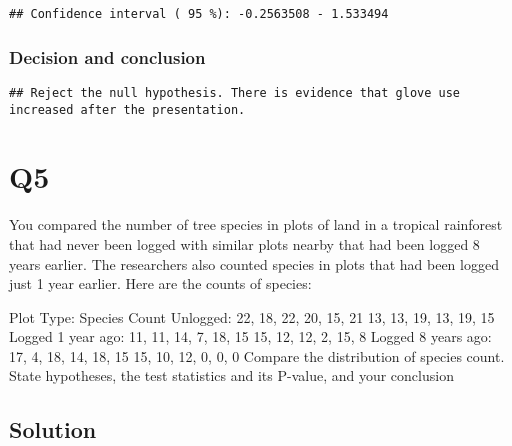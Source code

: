 \documentclass[
]{article}
\newenvironment{Shaded}{\begin{snugshade}}{\end{snugshade}}
\newcommand{\ControlFlowTok}[1]{\textcolor[rgb]{0.13,0.29,0.53}{\textbf{#1}}}
\newcommand{\FloatTok}[1]{\textcolor[rgb]{0.00,0.00,0.81}{#1}}
\newcommand{\FunctionTok}[1]{\textcolor[rgb]{0.00,0.00,0.00}{#1}}
\newcommand{\NormalTok}[1]{#1}
\newcommand{\SpecialCharTok}[1]{\textcolor[rgb]{0.00,0.00,0.00}{#1}}
\newcommand{\StringTok}[1]{\textcolor[rgb]{0.31,0.60,0.02}{#1}}
\begin{document}
\begin{verbatim}
## Confidence interval ( 95 %): -0.2563508 - 1.533494
\end{verbatim}

\hypertarget{decision-and-conclusion}{%
\subsubsection{Decision and conclusion}\label{decision-and-conclusion}}

\begin{Shaded}
\end{Shaded}

\begin{verbatim}
## Reject the null hypothesis. There is evidence that glove use increased after the presentation.
\end{verbatim}

\hypertarget{q5}{%
\section{Q5}\label{q5}}

You compared the number of tree species in plots of land in a tropical
rainforest that had never been logged with similar plots nearby that had
been logged 8 years earlier. The researchers also counted species in
plots that had been logged just 1 year earlier. Here are the counts of
species:

Plot Type: Species Count Unlogged: 22, 18, 22, 20, 15, 21 13, 13, 19,
13, 19, 15 Logged 1 year ago: 11, 11, 14, 7, 18, 15 15, 12, 12, 2, 15, 8
Logged 8 years ago: 17, 4, 18, 14, 18, 15 15, 10, 12, 0, 0, 0 Compare
the distribution of species count. State hypotheses, the test statistics
and its P-value, and your conclusion

\hypertarget{solution-4}{%
\subsection{Solution}\label{solution-4}}
\end{document}
